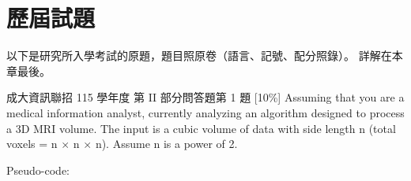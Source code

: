 \section{歷屆試題}
\label{sec:rec-pastexam}

以下是研究所入學考試的原題，題目照原卷（語言、記號、配分照錄）。 詳解在本章最後。

\begin{pastexam}[label={px:rec-1}]{成大資訊聯招 115 學年度 第 II 部分問答題第 1 題}
[10\%] Assuming that you are a medical information analyst, currently analyzing an
algorithm designed to process a 3D MRI volume. The input is a cubic volume of data with
side length n (total voxels = n $\times$ n $\times$ n). Assume n is a power of 2.

Pseudo-code:
\begin{center}
\end{center}


\end{pastexam}
